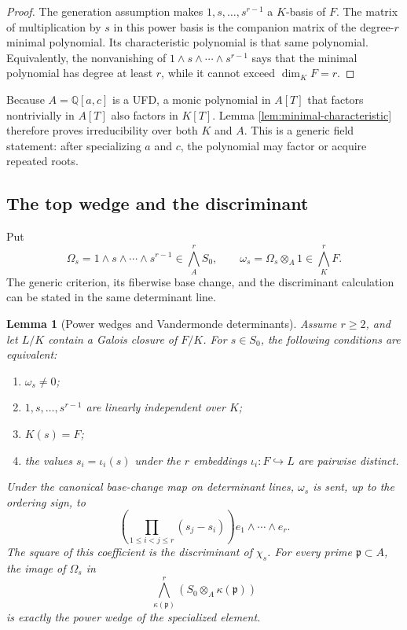 \documentclass[11pt]{article}
\newtheorem{lemma}[theorem]{Lemma}
\theoremstyle{definition}
\theoremstyle{remark}
\newcommand{\Q}{\mathbb{Q}}
\begin{document}
\begin{proof}
The generation assumption makes
$1,s,\ldots,s^{r-1}$ a $K$-basis of $F$.  The matrix of multiplication by
$s$ in this power basis is the companion matrix of the degree-$r$ minimal
polynomial.  Its characteristic polynomial is that same polynomial.
Equivalently, the nonvanishing of
$1\wedge s\wedge\cdots\wedge s^{r-1}$ says that the minimal polynomial has
degree at least $r$, while it cannot exceed $\dim_KF=r$.
\end{proof}

Because $A=\Q[a,c]$ is a UFD, a monic polynomial in $A[T]$ that factors
nontrivially in $A[T]$ also factors in $K[T]$.  Lemma
\ref{lem:minimal-characteristic} therefore proves irreducibility over both
$K$ and $A$.  This is a generic field statement: after specializing $a$ and
$c$, the polynomial may factor or acquire repeated roots.

\subsection{The top wedge and the discriminant}

Put
\[
 \Omega_s=1\wedge s\wedge\cdots\wedge s^{r-1}
 \in\bigwedge_A^rS_0,
 \qquad
 \omega_s=\Omega_s\otimes_A1
 \in\bigwedge_K^rF.
\]
The generic criterion, its fiberwise base change, and the discriminant
calculation can be stated in the same determinant line.

\begin{lemma}[Power wedges and Vandermonde determinants]
\label{lem:power-wedge-vandermonde}
Assume $r\geq2$, and let $L/K$ contain a Galois closure of $F/K$.  For
$s\in S_0$, the following conditions are equivalent:
\begin{enumerate}[label=\textup{(\roman*)}]
 \item $\omega_s\ne0$;
 \item $1,s,\ldots,s^{r-1}$ are linearly independent over $K$;
 \item $K(s)=F$;
 \item the values $s_i=\iota_i(s)$ under the $r$ embeddings
       $\iota_i:F\hookrightarrow L$ are pairwise distinct.
\end{enumerate}
Under the canonical base-change map on determinant lines, $\omega_s$ is
sent, up to the ordering sign, to
\[
 \left(\prod_{1\leq i<j\leq r}(s_j-s_i)\right)
 e_1\wedge\cdots\wedge e_r.
\]
The square of this coefficient is the discriminant of $\chi_s$.  For every
prime $\mathfrak p\subset A$, the image of $\Omega_s$ in
\[
 \bigwedge_{\kappa(\mathfrak p)}^r
 \left(S_0\otimes_A\kappa(\mathfrak p)\right)
\]
is exactly the power wedge of the specialized element.
\end{lemma}
\end{document}
